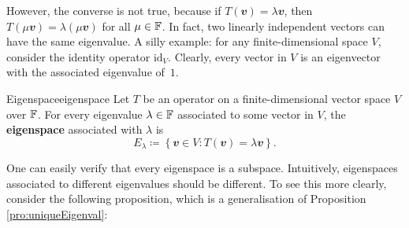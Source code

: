 \documentclass[math]{amznotes}
\theoremstyle{remark}
\begin{document}
However, the converse is not true, because if $T(\mathbfit{v}) = \lambda\mathbfit{v}$, then $T(\mu\mathbfit{v}) = \lambda(\mu\mathbfit{v})$ for all $\mu \in \mathbb{F}$. In fact, two linearly independent vectors can have the same eigenvalue. A silly example: for any finite-dimensional space $V$, consider the identity operator $\mathrm{id}_V$. Clearly, every vector in $V$ is an eigenvector with the associated eigenvalue of~$1$.
\begin{dfnbox}{Eigenspace}{eigenspace}
    Let $T$ be an operator on a finite-dimensional vector space $V$ over $\mathbb{F}$. For every eigenvalue $\lambda \in \mathbb{F}$ associated to some vector in $V$, the {\color{red} \textbf{eigenspace}} associated with $\lambda$ is 
    \begin{equation*}
        E_\lambda \coloneqq \left\{\mathbfit{v} \in V \colon T(\mathbfit{v}) = \lambda\mathbfit{v}\right\}.
    \end{equation*}
\end{dfnbox}
One can easily verify that every eigenspace is a subspace. Intuitively, eigenspaces associated to different eigenvalues should be different. To see this more clearly, consider the following proposition, which is a generalisation of Proposition \ref{pro:uniqueEigenval}:
\end{document}
